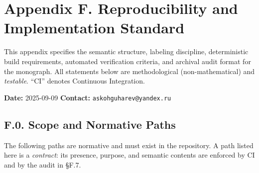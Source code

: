 \section*{Appendix F. Reproducibility and Implementation Standard}

\noindent
This appendix specifies the semantic structure, labeling discipline, deterministic build requirements,
automated verification criteria, and archival audit format for the monograph. All statements below are
methodological (non-mathematical) and \emph{testable}. “CI” denotes Continuous Integration.

\medskip
\noindent\textbf{Date:} 2025-09-09 \qquad \textbf{Contact:} \texttt{askohguharev@yandex.ru}


\subsection*{F.0. Scope and Normative Paths}

\noindent
The following paths are normative and must exist in the repository. A path listed here is a \emph{contract}:
its presence, purpose, and semantic contents are enforced by CI and by the audit in \S F.7.

